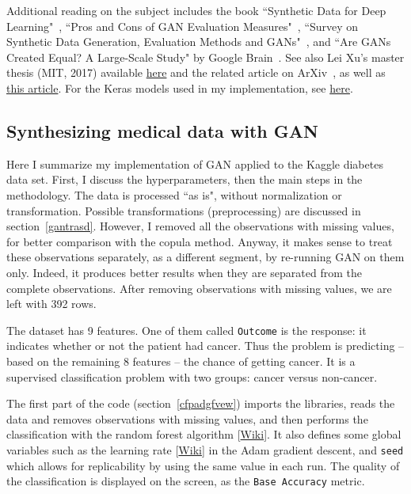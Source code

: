 \documentclass[oneside,10pt]{book}
\begin{document}
Additional reading on the subject includes the book ``Synthetic Data for Deep Learning"~\cite{sddl21},
``Pros and Cons of GAN Evaluation Measures"~\cite{procons21},
``Survey on Synthetic Data Generation, Evaluation Methods and GANs"~\cite{gan18pobt},
and ``Are GANs Created Equal? A Large-Scale Study" by Google Brain~\cite{gbrain18}.
See also Lei Xu's master thesis (MIT, 2017) available
 \href{https://dai.lids.mit.edu/wp-content/uploads/2020/02/Lei_SMThesis_neo.pdf}{here}
 and the related article on ArXiv~\cite{lw18},
 as well as \href{https://www.maskaravivek.com/post/ctgan-tabular-synthetic-data-generation/}{this article}.
 For the Keras models used in my implementation, see \href{https://www.activestate.com/resources/quick-reads/what-is-a-keras-model/}{here}.

\subsection{Synthesizing medical data with GAN}

Here I summarize my implementation of GAN applied to the Kaggle diabetes data set. First, I discuss the
\textcolor{index}{hyperparameters}, then the main steps in the methodology. The
 data is processed ``as is", without normalization or transformation. Possible transformations (preprocessing) are discussed in
section~\ref{gantrasd}. However, I removed all the observations with missing values, for better comparison with the copula method.
 Anyway, it makes sense to treat these observations separately, as a different segment, by re-running GAN on them only. Indeed, it produces better results when they are separated from the complete observations. After removing observations with missing values, we are left with 392 rows.

The dataset has 9 features. One of them called \texttt{Outcome} is the response: it indicates whether or not the patient had cancer. Thus the problem is predicting -- based on the remaining 8 features -- the chance of getting cancer. It is a supervised classification problem with two groups:
 cancer versus non-cancer.

The first part of the code (section~\ref{cfpadgfvew}) imports the libraries, reads the data and removes observations with missing values, and then
performs the classification with the \textcolor{index}{random forest} algorithm [\href{https://en.wikipedia.org/wiki/Random_forest}{Wiki}].
It also defines some global variables such as the \textcolor{index}{learning rate} [\href{https://en.wikipedia.org/wiki/Learning_rate}{Wiki}] in the Adam gradient descent, and \textcolor{index}{\texttt{seed}} which allows for replicability by using the same value in each run.
 The quality of the classification is displayed on the screen, as the \texttt{Base Accuracy} metric.
\end{document}
